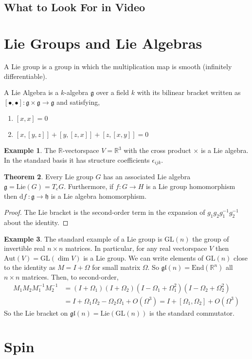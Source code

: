 \documentclass[12pt]{extarticle}
\newcommand{\R}{\mathbb{R}}
\newcommand{\End}[1]{\mathrm{End}\left(#1\right)}
\renewcommand{\d}[1]{ \mathrm{d}#1 \:}
\theoremstyle{definition}
\newtheorem{theorem}{Theorem}[section]
\newtheorem{example}[theorem]{Example}
\newenvironment{definition}[1][Definition:]{\begin{trivlist}
\item[\hskip \labelsep {\bfseries #1}]}{\end{trivlist}}
\newcommand{\GL}[1]{\mathrm{GL}\left(#1\right)}
\newcommand{\g}{\mathfrak{g}}
\newcommand{\h}{\mathfrak{h}}
\newcommand{\gl}[1]{\mathfrak{gl}\left(#1\right)}
\newcommand{\Lie}[1]{\mathrm{Lie}\left(#1 \right)}
\newcommand{\Aut}[1]{\mathrm{Aut}\left(#1 \right)}
\begin{document}
\subsection{What to Look For in Video}

\section{Lie Groups and Lie Algebras}

\begin{definition}
A Lie group is a group in which the multiplication map is smooth (infinitely differentiable). 
\end{definition}

\begin{definition}
A Lie Algebra is a $k$-algebra $\g$ over a field $k$ with its bilinear bracket written as $[ \bullet, \bullet] : \g \times \g \to \g$ and satisfying,
\begin{enumerate}
\item $[x,x] = 0$
\item $[x, [y, z]] + [y, [z, x]] + [z, [x, y]] = 0$
\end{enumerate}
\end{definition}

\begin{example}
The $\R$-vectorspace $V = \R^3$ with the cross product $\times$ is a Lie algebra. In the standard basis it has structure coefficients $\epsilon_{ijk}$. 
\end{example}


\begin{theorem}
Every Lie group $G$ has an associated Lie algebra $\g = \Lie{G} = T_e G$. Furthermore, if $f : G \to H$ is a Lie group homomorphism then $\d{f} : \g \to \h$ is a Lie algebra homomorphism.
\end{theorem}

\begin{proof}
The Lie bracket is the second-order term in the expansion of $g_1 g_2 g_1^{-1} g_2^{-1}$ about the identity.
\end{proof}

\begin{example}
The standard example of a Lie group is $\GL{n}$ the group of invertible real $n \times n$ matrices. In particular, for any real vectorspace $V$ then $\Aut{V} = \GL{\dim{V}}$ is a Lie group. We can write elements of $\GL{n}$ close to the identity as $M = I + \Omega$ for small matrix $\Omega$. So $\gl{n} = \End{\R^n}$ all $n \times n$ matrices. Then, to second-order,
\begin{align*}
M_1 M_2 M_1^{-1} M_2^{-1} & = (I + \Omega_1)(I + \Omega_2)(I - \Omega_1 + \Omega_1^2)(I - \Omega_2 + \Omega_2^2)
\\
& = I + \Omega_1 \Omega_2 - \Omega_2 \Omega_1 + O(\Omega^3) = I + [\Omega_1, \Omega_2] + O(\Omega^3)
\end{align*}
So the Lie bracket on $\gl{n} = \Lie{\GL{n}}$ is the standard commutator. 
\end{example}

\section{Spin}
 
 
\end{document}
